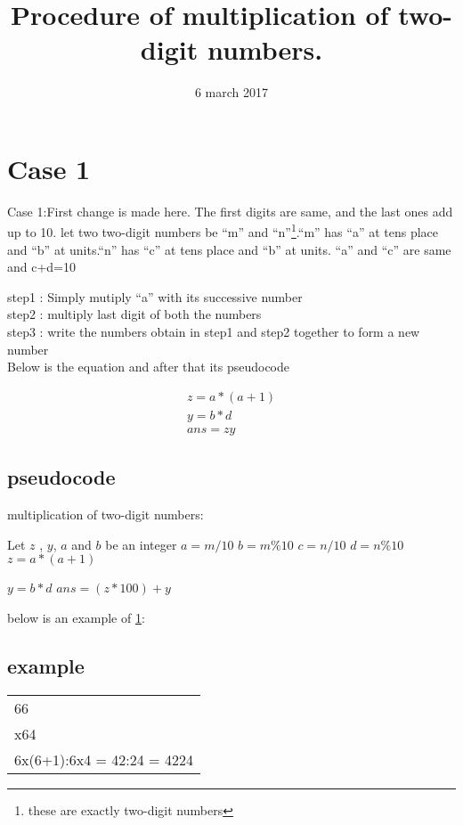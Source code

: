 \documentclass{article}
\title{\huge Procedure of multiplication of two-digit numbers.}
\date{6 march 2017}
\begin{document}
\begin{titlepage}
\maketitle
\end{titlepage}
\newpage
\section{Case 1} \label{case 1}
\noindent Case 1:First change is made here. The first digits are same, and the last ones add up to 10.
let two two-digit numbers be ``m'' and ``n''\footnote{these are exactly two-digit numbers}.``m'' has ``a'' at tens place and ``b'' at units.``n'' has ``c'' at tens place and ``b'' at units. ``a'' and ``c'' are same and c+d=10\cite{athar}

\noindent step1 : Simply mutiply ``a'' with its successive number \\
step2 : multiply last digit of both the numbers \\
step3 : write the numbers obtain in step1 and step2 together to form a new number\\

\noindent Below is the equation and after that its pseudocode


\begin{align*}
	z=a*(a+1)  \\
	y=b*d \\
	ans=zy
	\end{align*}
\subsection{pseudocode}
  \begin{algorithm}
   \caption{multiplication of two-digit numbers: }
    \begin{algorithmic}[1]
	\State 

	\State Let $z$ , $y$, $a$ and $b$ be an integer
\State $a=m/10$
\State $b=m\%10$
\State $c=n/10$
\State $d=n\%10$
	\State $z=a*(a+1)$
	
	\State $y=b*d$
	\State $ans=(z*100)+y$ 
	
	\EndIf
	\EndFunction
\end{algorithmic}
\end{algorithm}
\noindent below is an example of \ref{case 1}:
\newline
\subsection{example}
\begin{tabular}{l} 
66\\

x64\\

6x(6+1):6x4 = 42:24 = 4224\\
\end{tabular}
\end{document}
